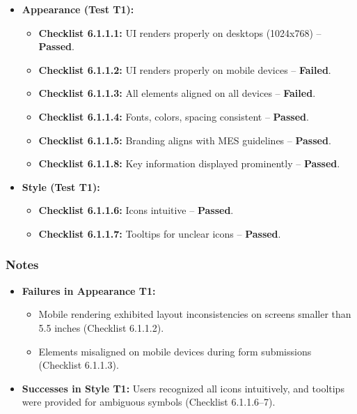 \documentclass[12pt, titlepage]{article}
\begin{document}
\begin{itemize}
    \item \textbf{Appearance (Test T1):}  
    \begin{itemize}
        \item \textbf{Checklist 6.1.1.1:} UI renders properly on desktops (1024x768) – \textbf{Passed}.  
        \item \textbf{Checklist 6.1.1.2:} UI renders properly on mobile devices – \textbf{Failed}.  
        \item \textbf{Checklist 6.1.1.3:} All elements aligned on all devices – \textbf{Failed}.  
        \item \textbf{Checklist 6.1.1.4:} Fonts, colors, spacing consistent – \textbf{Passed}.  
        \item \textbf{Checklist 6.1.1.5:} Branding aligns with MES guidelines – \textbf{Passed}.  
        \item \textbf{Checklist 6.1.1.8:} Key information displayed prominently – \textbf{Passed}.  
    \end{itemize}
    
    \item \textbf{Style (Test T1):}  
    \begin{itemize}
        \item \textbf{Checklist 6.1.1.6:} Icons intuitive – \textbf{Passed}.  
        \item \textbf{Checklist 6.1.1.7:} Tooltips for unclear icons – \textbf{Passed}.  
    \end{itemize}
\end{itemize}

\subsubsection*{Notes}  
\begin{itemize}
    \item \textbf{Failures in Appearance T1:}  
    \begin{itemize}
        \item Mobile rendering exhibited layout inconsistencies on screens smaller than 5.5 inches (Checklist 6.1.1.2).  
        \item Elements misaligned on mobile devices during form submissions (Checklist 6.1.1.3).  
    \end{itemize}
    \item \textbf{Successes in Style T1:} Users recognized all icons intuitively, and tooltips were provided for ambiguous symbols (Checklist 6.1.1.6–7).  
\end{itemize}
\end{document}
